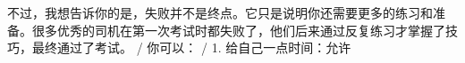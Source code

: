 \begin{multicols}{2}
不\allowbreak{}过\allowbreak{}，\allowbreak{}我\allowbreak{}想\allowbreak{}告\allowbreak{}诉\allowbreak{}你\allowbreak{}的\allowbreak{}是\allowbreak{}\allowbreak{}，\allowbreak{}失\allowbreak{}败\allowbreak{}并\allowbreak{}不\allowbreak{}是\allowbreak{}终\allowbreak{}点\allowbreak{}。\allowbreak{}它\allowbreak{}\allowbreak{}只\allowbreak{}是\allowbreak{}说\allowbreak{}明\allowbreak{}你\allowbreak{}还\allowbreak{}需\allowbreak{}要\allowbreak{}更\allowbreak{}多\allowbreak{}\allowbreak{}的\allowbreak{}练\allowbreak{}习\allowbreak{}和\allowbreak{}准\allowbreak{}备\allowbreak{}。\allowbreak{}很\allowbreak{}多\allowbreak{}优\allowbreak{}\allowbreak{}秀\allowbreak{}的\allowbreak{}司\allowbreak{}机\allowbreak{}在\allowbreak{}第\allowbreak{}一\allowbreak{}次\allowbreak{}考\allowbreak{}试\allowbreak{}\allowbreak{}时\allowbreak{}都\allowbreak{}失\allowbreak{}败\allowbreak{}了\allowbreak{}，\allowbreak{}他\allowbreak{}们\allowbreak{}后\allowbreak{}来\allowbreak{}\allowbreak{}通\allowbreak{}过\allowbreak{}反\allowbreak{}复\allowbreak{}练\allowbreak{}习\allowbreak{}才\allowbreak{}掌\allowbreak{}握\allowbreak{}了\allowbreak{}\allowbreak{}技\allowbreak{}巧\allowbreak{}，\allowbreak{}最\allowbreak{}终\allowbreak{}通\allowbreak{}过\allowbreak{}了\allowbreak{}考\allowbreak{}试\allowbreak{}\allowbreak{}。\allowbreak{} / 你\allowbreak{}可\allowbreak{}以\allowbreak{}：\allowbreak{} / 1. 给\allowbreak{}自\allowbreak{}己\allowbreak{}一\allowbreak{}点\allowbreak{}时\allowbreak{}间\allowbreak{}：\allowbreak{}允\allowbreak{}许\allowbreak{}\par\medskip

\end{multicols}
